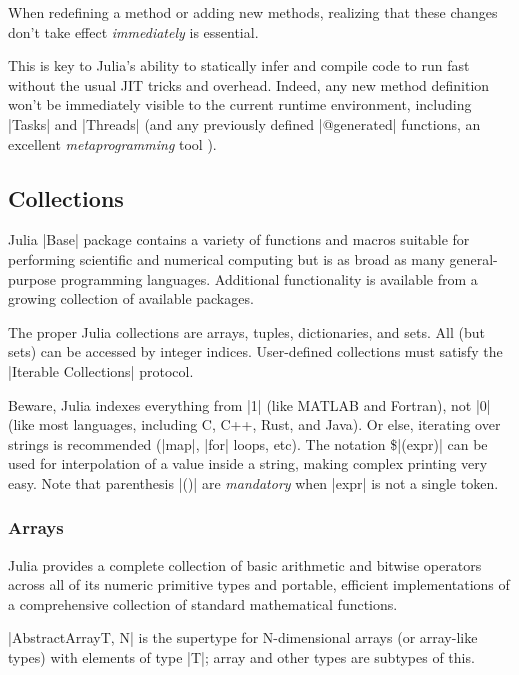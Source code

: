 \begin{remark}
When redefining a method or adding new methods, realizing that these changes don't take effect \emph{immediately} is essential. 

This is key to Julia's ability to statically infer and compile code to run fast without the usual JIT tricks and overhead. Indeed, any new method definition won't be immediately visible to the current runtime environment, including |Tasks| and |Threads| (and any previously defined |@generated| functions, an excellent \emph{metaprogramming} tool \cite{julia:metaprogramming}).
\end{remark}


\subsection{Collections}

Julia |Base| package contains a variety of functions and macros suitable for performing scientific and numerical computing but is as broad as many general-purpose programming languages. Additional functionality is available from a growing collection of available packages. 

The proper Julia collections are arrays, tuples, dictionaries, and sets. All (but sets) can be accessed by integer indices. User-defined collections must satisfy the |Iterable Collections| protocol.


Beware, Julia indexes everything from |1| (like MATLAB and Fortran), not |0| (like most languages, including C, C++, Rust, and Java). Or else, iterating over strings is recommended (|map|, |for| loops, etc). The notation \$|(expr)| can be used for interpolation of a value inside a string, making complex printing very easy. Note that parenthesis |()| are \emph{mandatory} when |expr| is not a single token.


\subsubsection*{Arrays}

Julia provides a complete collection of basic arithmetic and bitwise operators across all of its numeric primitive types and portable, efficient implementations of a comprehensive collection of standard mathematical functions.

|AbstractArray{T, N}| is the supertype for N-dimensional arrays (or array-like types) with elements of type |T|; array and other types are subtypes of this.

